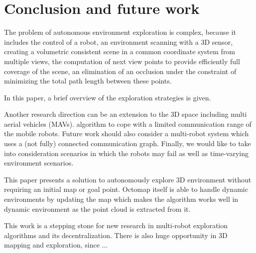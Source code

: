 \section{Conclusion and future work} \label{sec:conclusion}

The problem of autonomous environment exploration is complex, because it includes the control of a robot, an environment scanning with a 3D sensor, creating a volumetric consistent scene in a common coordinate system from multiple views, the computation of next view points to provide efficiently full coverage of the scene, an elimination of an 
occlusion under the constraint of minimizing the total
path length between these points. 

In this paper, a brief overview of the exploration strategies is given. 

Another research direction can be an extension to the 3D space including multi aerial vehicles (MAVs).  algorithm to cope with a limited communication range of the mobile robots. Future work should also consider a multi-robot system which uses a (not fully) connected communication graph. Finally, we would like to take into consideration scenarios in which the robots may fail as well as time-varying environment scenarios.

This paper presents a solution to autonomously explore 3D environment without requiring an initial map or goal point. Octomap itself is able to handle dynamic environments by updating the map which makes the
algorithm works well in dynamic environment as the point
cloud is extracted from it.

This work is a stepping stone for new research in multi-robot exploration algorithms and its decentralization. There is also huge opportunity in 3D mapping and exploration, since ...